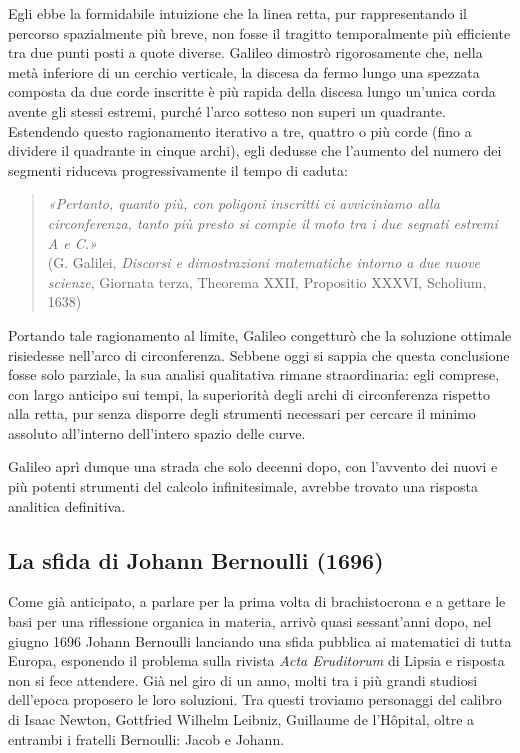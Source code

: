 \documentclass[a4paper,12pt]{article} %
\begin{document}
Egli ebbe la formidabile intuizione che la linea retta, pur rappresentando il percorso spazialmente più breve, non fosse il tragitto temporalmente più efficiente tra due punti posti a quote diverse. Galileo dimostrò rigorosamente che, nella metà inferiore di un cerchio verticale, la discesa da fermo lungo una spezzata composta da due corde inscritte è più rapida della discesa lungo un’unica corda avente gli stessi estremi, purché l’arco sotteso non superi un quadrante. Estendendo questo ragionamento iterativo a tre, quattro o più corde (fino a dividere il quadrante in cinque archi), egli dedusse che l'aumento del numero dei segmenti riduceva progressivamente il tempo di caduta:
\begin{quote}
    \textit{«Pertanto, quanto più, con poligoni inscritti ci avviciniamo alla circonferenza, tanto più presto si compie il moto tra i due segnati estremi A e C.»} \\
    \footnotesize{(G. Galilei, \textit{Discorsi e dimostrazioni matematiche intorno a due nuove scienze}, Giornata terza, Theorema XXII, Propositio XXXVI, Scholium, 1638)}
\end{quote}
Portando tale ragionamento al limite, Galileo congetturò che la soluzione ottimale risiedesse nell'arco di circonferenza. Sebbene oggi si sappia che questa conclusione fosse solo parziale, la sua analisi qualitativa rimane straordinaria: egli comprese, con largo anticipo sui tempi, la superiorità degli archi di circonferenza rispetto alla retta, pur senza disporre degli strumenti necessari per cercare il minimo assoluto all'interno dell'intero spazio delle curve.

Galileo aprì dunque una strada che solo decenni dopo, con l'avvento dei nuovi e più potenti strumenti del calcolo infinitesimale, avrebbe trovato una risposta analitica definitiva.

\subsection{La sfida di Johann Bernoulli (1696)}

Come già anticipato, a parlare per la prima volta di brachistocrona e a gettare le basi per una riflessione organica in materia, arrivò quasi sessant'anni dopo, nel giugno 1696 Johann Bernoulli lanciando una sfida pubblica ai matematici di tutta Europa, esponendo il problema sulla rivista \textit{Acta Eruditorum} di Lipsia e risposta non si fece attendere. Già nel giro di un anno, molti tra i più grandi studiosi dell'epoca proposero le loro soluzioni. Tra questi troviamo personaggi del calibro di Isaac Newton, Gottfried Wilhelm Leibniz, Guillaume de l'Hôpital, oltre a entrambi i fratelli Bernoulli: Jacob e Johann.
\end{document}
